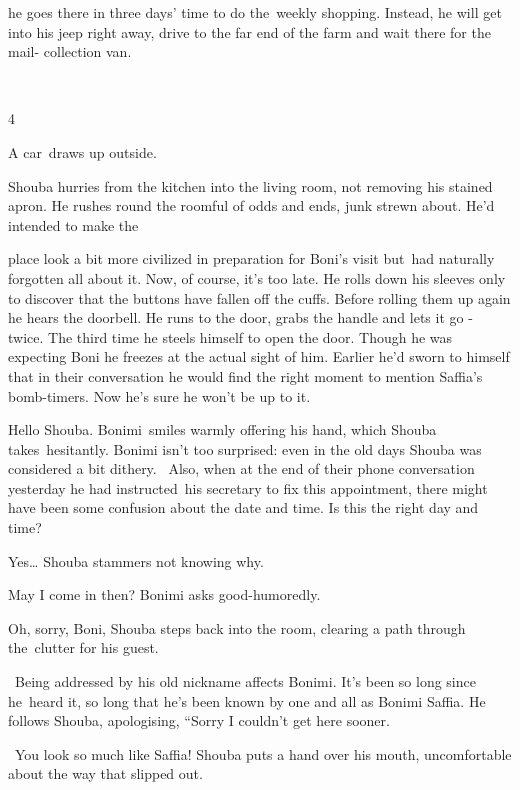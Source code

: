 \documentclass[letterpaper]{article}
\begin{document}
he goes there in three days' time to do the~weekly shopping. Instead, he will get into his jeep right away, drive to the
far end of the farm and wait there for the mail- collection van.

~

4

A car~draws up outside.{ }

Shouba hurries from the kitchen into the living room, not removing his stained apron. He rushes round the roomful of
odds and ends, junk strewn about. He'd intended to make the 

place look a bit more civilized in preparation for Boni's visit but~had naturally forgotten all about it. Now, of
course, it's too late. He rolls down his sleeves only to discover that the buttons have fallen off the cuffs. Before
rolling them up again he hears the doorbell. He runs to the door, grabs the handle and lets it go - twice. The third
time he steels himself to open the door. Though he was expecting Boni he freezes at the actual sight of him. Earlier
he'd sworn to himself that in their conversation he would find the right moment to mention Saffia's bomb-timers. Now
he's sure he won't be up to it.

{\textquotedbl}Hello Shouba.{\textquotedbl} Bonimi~smiles warmly offering his hand, which Shouba takes~hesitantly.
Bonimi isn't too surprised: even in the old days Shouba was considered a bit dithery. \ Also, when at the end of their
phone conversation yesterday he had instructed~his secretary to fix this appointment, there might have been some
confusion about the date and time. {\textquotedbl}Is this the right day and time?{\textquotedbl} 

{\textquotedbl}Yes{\dots}{\textquotedbl} Shouba stammers not knowing why.

{\textquotedbl}May I come in then?{\textquotedbl} Bonimi asks good-humoredly.

{\textquotedbl}Oh, sorry, Boni,{\textquotedbl} Shouba steps back into the room, clearing a path through the~clutter for
his guest. 

~Being addressed by his old nickname affects Bonimi. It's been so long since he~heard it, so long that he's been known
by{ }one and all as Bonimi Saffia. He follows Shouba, apologising, ``Sorry I
couldn't get here sooner.{\textquotedbl}

~{\textquotedbl}You look so much like Saffia!{\textquotedbl} Shouba puts a hand over his mouth, uncomfortable about the
way that slipped out.
\end{document}

